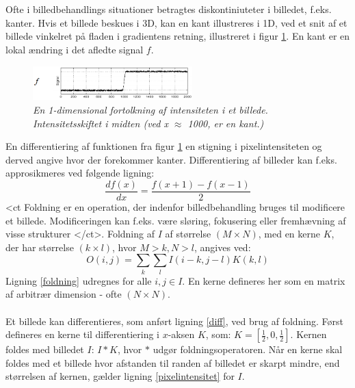 \\
\\
Ofte i billedbehandlings situationer betragtes diskontiniuteter i billedet, f.eks. kanter.
Hvis et billede beskues i 3D, kan en kant illustreres i 1D, ved et snit af et billede vinkelret på fladen i gradientens retning, illustreret i figur \ref{fig:kant}. En kant er en lokal ændring i det afledte signal $f$.
\noindent
\begin{figure}[H]
    \centering
    \includegraphics[width=0.55\textwidth]{fig/7.png}
     \vspace{-1em}
    \begin{center}        
     \caption{{\footnotesize \textit{
En 1-dimensional fortolkning af intensiteten i et billede. Intensitetsskiftet i midten (ved x $\approx$ 1000, er en kant.)}}}
    \label{fig:kant}
     \end{center}
       \vspace{-2.5em}
  \end{figure}
\noindent
En differentiering af funktionen fra figur \ref{fig:kant} en stigning i pixelintensiteten  og derved angive hvor der forekommer kanter. Differentiering af billeder kan f.eks. approsikmeres ved følgende ligning:
\begin{equation}
\dfrac{df(x)}{dx}=\dfrac{f(x+1)-f(x-1)}{2}
\label{diff}
\end{equation}
<ct Foldning er en operation, der indenfor billedbehandling bruges til modificere et billede. Modificeringen kan f.eks. være sløring, fokusering eller fremhævning af visse strukturer </ct>. Foldning af $I$ af størrelse $(M \times N)$, med en kerne $K$, der har størrelse $(k \times l)$, hvor $M > k, N > l$, angives ved:
\begin{equation}
O(i,j) = \sum_{k} \sum_{l} I(i-k, j-l) K(k,l)
\label{foldning}
\end{equation}
Ligning \eqref{foldning} udregnes for alle $i,j \in I$. En kerne defineres her som en matrix af arbitrær dimension - ofte $(N\times N)$. 
\\
\\
Et billede kan differentieres, som anført ligning \eqref{diff}, ved brug af foldning. Først defineres en kerne til differentiering i $x$-aksen $K$, som: $K = [\frac{1}{2}, 0, \frac{1}{2}]$. Kernen foldes med billedet $I$: $I \ast K $, hvor $\ast$ udgør foldningsoperatoren. Når en kerne skal foldes med et billede hvor afstanden til randen af billedet er skarpt mindre, end størrelsen af kernen, gælder ligning \eqref{pixelintensitet} for $I$.
